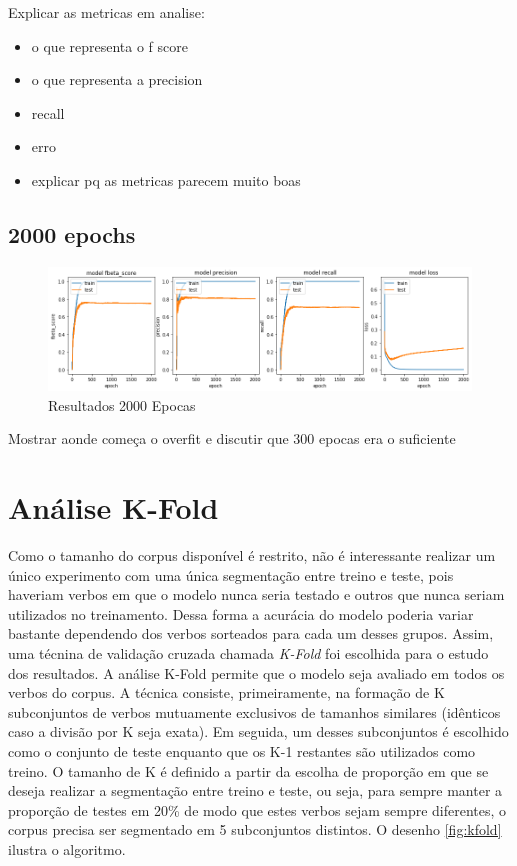 Explicar as metricas em analise:
\begin{itemize}
    \item o que representa o f score
    \item o que representa a precision
    \item recall
    \item erro
    \item explicar pq as metricas parecem muito boas
\end{itemize}
\subsection{2000 epochs}


\begin{figure}[H]
  \centering
  \includegraphics[width=1.0\linewidth]{img/2000_precision.png}
  \caption{Resultados 2000 Epocas}
  \label{fig:encdec}
\end{figure}

Mostrar aonde começa o overfit e discutir que 300 epocas era o suficiente

\section{Análise K-Fold}

Como o tamanho do corpus disponível é restrito, não é interessante realizar um único experimento com uma única segmentação entre treino e teste, pois haveriam verbos em que o modelo nunca seria testado e outros que nunca seriam utilizados no treinamento. Dessa forma a acurácia do modelo poderia variar bastante dependendo dos verbos sorteados para cada um desses grupos. Assim, uma técnina de validação cruzada chamada \textit{K-Fold} foi escolhida para o estudo dos resultados. A análise K-Fold permite que o modelo seja avaliado em todos os verbos do corpus. A técnica consiste, primeiramente, na formação de K subconjuntos de verbos mutuamente exclusivos de tamanhos similares (idênticos caso a divisão por K seja exata). Em seguida, um desses subconjuntos é escolhido como o conjunto de teste enquanto que os K-1 restantes são utilizados como treino. O tamanho de K é definido a partir da escolha de proporção em que se deseja realizar a segmentação entre treino e teste, ou seja, para sempre manter a proporção de testes em 20\% de modo que estes verbos sejam sempre diferentes, o corpus precisa ser segmentado em 5 subconjuntos distintos. O desenho \ref{fig:kfold} ilustra o algoritmo. 

